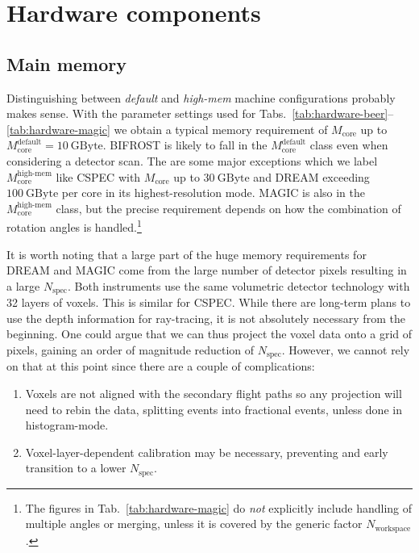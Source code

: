 \documentclass[a4paper,english,numbers=noenddot,bibliography=totoc,chapterprefix=on,DIV=12]{scrartcl}
\newcommand{\Nworkspace}{N_{\text{workspace}}}
\newcommand{\Nspec}{N_{\text{spec}}}
\newcommand{\Mcore}{M_{\text{core}}}
\newcommand{\bifrost}{BIFROST\xspace}
\newcommand{\cspec}{CSPEC\xspace}
\newcommand{\dream}{DREAM\xspace}
\newcommand{\magic}{MAGIC\xspace}
\begin{document}
\section{Hardware components}


\subsection{Main memory}

Distinguishing between \emph{default} and \emph{high-mem} machine configurations probably makes sense.
With the parameter settings used for Tabs.~\ref{tab:hardware-beer}--\ref{tab:hardware-magic} we obtain a typical memory requirement of $\Mcore$ up to $\Mcore^{\text{default}} = 10~\mathrm{GByte}$.
\bifrost is likely to fall in the $\Mcore^{\text{default}}$ class even when considering a detector scan.
The are some major exceptions which we label $\Mcore^{\text{high-mem}}$ like \cspec with $\Mcore$ up to $30~\mathrm{GByte}$ and \dream exceeding $100~\mathrm{GByte}$ per core in its highest-resolution mode.
\magic is also in the $\Mcore^{\text{high-mem}}$ class, but the precise requirement depends on how the combination of rotation angles is handled.\footnote{The figures in Tab.~\ref{tab:hardware-magic} do \emph{not} explicitly include handling of multiple angles or merging, unless it is covered by the generic factor $\Nworkspace$.}

It is worth noting that a large part of the huge memory requirements for \dream and \magic come from the large number of detector pixels resulting in a large $\Nspec$.
Both instruments use the same volumetric detector technology with 32 layers of voxels.
This is similar for \cspec.
While there are long-term plans to use the depth information for ray-tracing, it is not absolutely necessary from the beginning.
One could argue that we can thus project the voxel data onto a grid of pixels, gaining an order of magnitude reduction of $\Nspec$.
However, we cannot rely on that at this point since there are a couple of complications:
\begin{enumerate}
  \item Voxels are not aligned with the secondary flight paths so any projection will need to rebin the data, splitting events into fractional events, unless done in histogram-mode.
  \item Voxel-layer-dependent calibration may be necessary, preventing and early transition to a lower $\Nspec$.
\end{enumerate}
\end{document}
